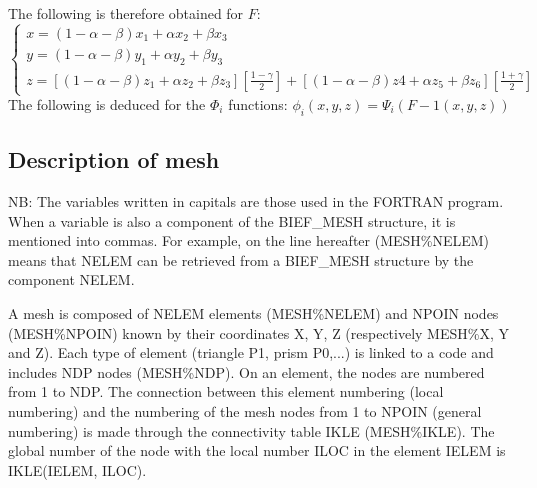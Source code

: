 The following is therefore obtained for $F$:
\[\left\{\begin{array}{c} {x=(1-\alpha -\beta )x_{1} +\alpha x_{2} +\beta x_{3}
  } \\ {y=(1-\alpha -\beta )y_{1} +\alpha y_{2} +\beta y_{3} } \\
  {z=\left[(1-\alpha -\beta )z_{1} +\alpha z_{2} +\beta z_{3}
  \right]\left[\frac{1-\gamma }{2} \right]+\left[(1-\alpha -\beta )z4+\alpha
  z_{5} +\beta z_{6} \right]\left[\frac{1+\gamma }{2} \right]}
  \end{array}\right. \]
  The following is deduced for the $\Phi _{i}$ functions:
  $\phi _{i} (x, y, z) =  \Psi _{i} (F-1 (x, y, z))$

\subsection{Description of mesh}

NB: The variables written in capitals are those used in the \bief FORTRAN
program. When a variable is also a component of the BIEF\_MESH structure, it is
mentioned into commas. For example, on the line hereafter (MESH\%NELEM) means
that NELEM can be retrieved from a BIEF\_MESH structure by the component
NELEM.

A mesh is composed of NELEM elements (MESH\%NELEM) and NPOIN nodes
(MESH\%NPOIN) known by their coordinates X, Y, Z (respectively MESH\%X, Y and
Z). Each type of element (triangle P1, prism P0,...) is linked to a code and
includes NDP nodes (MESH\%NDP). On an element, the nodes are numbered from 1 to
NDP. The connection between this element numbering (local numbering) and the
numbering of the mesh nodes from 1 to NPOIN (general numbering) is made through
the connectivity table IKLE (MESH\%IKLE). The global number of the node with
the local number ILOC in the element IELEM is IKLE(IELEM, ILOC).

